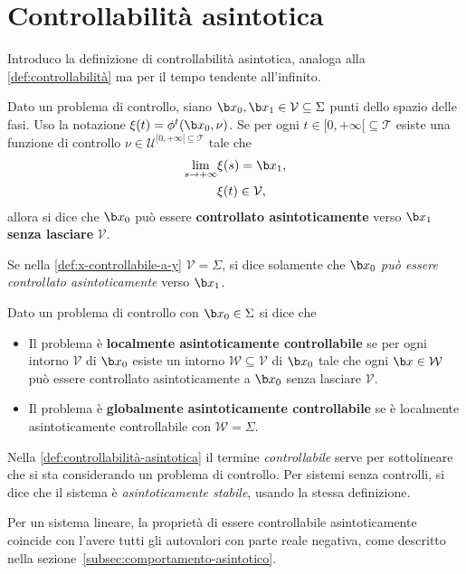 \section{Controllabilità asintotica}
Introduco la definizione di controllabilità asintotica, analoga alla
\autoref{def:controllabilità} ma per il tempo tendente all'infinito.
\begin{definition}
    Dato un problema di controllo, siano
     $\b x_0, \b x_1 \in \mathcal V \subseteq \Sigma$ punti dello spazio delle fasi.
    Uso la notazione $\xi(t) = \phi^t(\b x_0, \nu)$.
    Se per ogni $t \in[0, +\infty[ \subseteq \mathcal T$
    esiste una funzione di controllo $\nu \in  \mathcal U^{[0, +\infty[ \subseteq \mathcal T}$ tale che
    \begin{align*}
       \lim_{s \to +\infty} &\xi(s) = \b x_1,\\
       &\xi(t) \in \mathcal V,
    \end{align*}
    allora si dice che $\b x_0$ può essere \textbf{controllato asintoticamente} verso
    $\b x_1$ \textbf{senza lasciare} $\mathcal V$.
    \label{def:x-controllabile-a-y}
\end{definition}
Se nella \autoref{def:x-controllabile-a-y} $\mathcal V = \Sigma$,
si dice solamente che
$\b x_0$ \emph{può essere controllato asintoticamente} verso $\b x_1$.
\begin{definition}
    Dato un problema di controllo con $\b x_0 \in \Sigma$ si dice che
    \begin{itemize}
        \item Il problema è \textbf{localmente asintoticamente controllabile}
        se per ogni intorno $\mathcal V$ di $\b x_0$ esiste un intorno
        $\mathcal W \subseteq \mathcal V$ di $\b x_0$ tale che ogni $\b x \in \mathcal W$
        può essere controllato asintoticamente a $\b x_0$ senza lasciare $\mathcal V$.

        \item Il problema è \textbf{globalmente asintoticamente controllabile} se
        è localmente asintoticamente controllabile con $\mathcal W = \Sigma$.
    \end{itemize}
    \label{def:controllabilità-asintotica}
\end{definition}
Nella \autoref{def:controllabilità-asintotica} il termine \emph{controllabile}
serve per sottolineare che si sta considerando un problema di controllo.
Per sistemi senza controlli, si dice che il sistema è \emph{asintoticamente stabile}, usando la
stessa definizione.

Per un sistema lineare, la proprietà di
essere controllabile asintoticamente coincide con l'avere tutti gli autovalori
con parte reale negativa, come descritto nella sezione~\ref{subsec:comportamento-asintotico}.
